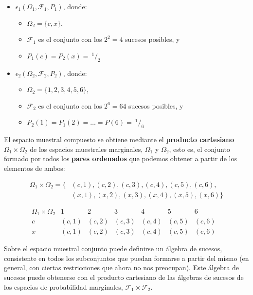 \documentclass[11pt]{article}
\providecommand{\tightlist}{%
      \setlength{\itemsep}{0pt}\setlength{\parskip}{0pt}}
\begin{document}
\begin{itemize}
\tightlist
\item
  \(\epsilon_1 (\Omega_1, \mathscr{F}_1, P_1)\), donde:
\begin{itemize}
\item
  \(\Omega_2=\{c,x\}\),
\item
  \(\mathscr{F}_1\) es el conjunto con los \(2^2=4\) sucesos posibles, y
\item
  \(P_1(c)=P_2(x)= \ ^1/_2\)
\end{itemize}
\item
  \(\epsilon_2 (\Omega_2, \mathscr{F}_2, P_2)\), donde:
\begin{itemize}
\item
  \(\Omega_2=\{1,2,3,4,5,6\}\),
\item
  \(\mathscr{F}_2\) es el conjunto con los \(2^6=64\) sucesos posibles,
  y
\item
  \(P_2(1)=P_1(2)=\ldots =P(6)= \ ^1/_6\)
\end{itemize}
\end{itemize}

    El espacio muestral compuesto se obtiene mediante el \textbf{producto
cartesiano} \(\Omega_1 \times \Omega_2\) de los espacios muestrales
marginales, \(\Omega_1\) y \(\Omega_2\), esto es, el conjunto formado
por todos los \textbf{pares ordenados} que podemos obtener a partir de
los elementos de ambos:

\begin{align*}
\Omega_1 \times \Omega_2 = \{&(c,1), (c,2), (c,3), (c,4), (c,5), (c,6),\\ &(x,1), (x,2), (x,3), (x,4), (x,5), (x,6)\}
\end{align*}

\[
\begin{array}{c|cccccccc|c}
  \Omega_1 \times \Omega_2 & 1 & 2 & 3 & 4 & 5 & 6 & \\ 
  \hline
  c & (c,1) & (c,2) & (c,3) & (c,4) & (c,5) & (c,6) &  \\
  \hline
  x & (c,1) & (c,2) & (c,3) & (c,4) & (c,5) & (c,6) & 
 \end{array}
\]

    Sobre el espacio muestral conjunto puede definirse un álgebra de
sucesos, consistente en todos los subconjuntos que puedan formarse a
partir del mismo (en general, con ciertas restricciones que ahora no nos
preocupan). Este álgebra de sucesos puede obtenerse con el producto
cartesiano de las álgebras de sucesos de los espacios de probabilidad
marginales, \(\mathscr{F}_1\times \mathscr{F}_2\).
\end{document}
